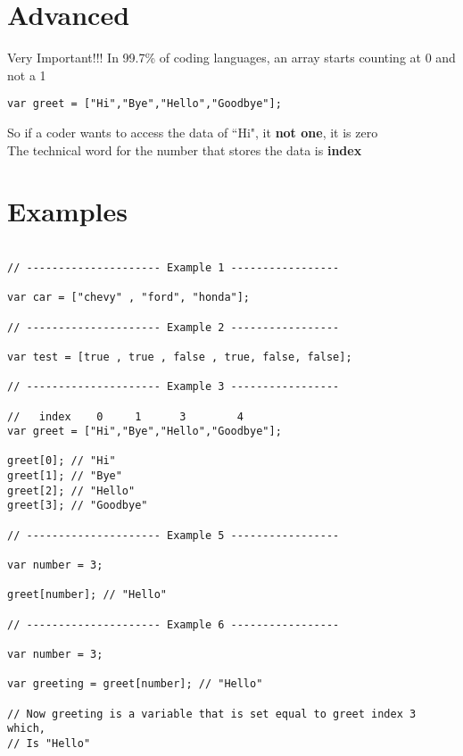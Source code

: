 \documentclass[12pt, letterpaper]{article}
\begin{document}
\section*{Advanced}

Very Important!!! In 99.7\% of coding languages, an array starts counting at 0 and not a 1
\begin{lstlisting}
var greet = ["Hi","Bye","Hello","Goodbye"];
\end{lstlisting}
So if a coder wants to access the data of ``Hi", it \textbf{not one}, it is zero\\
The technical word for the number that stores the data is \textbf{index}

\section*{Examples}

\begin{lstlisting}

// --------------------- Example 1 -----------------

var car = ["chevy" , "ford", "honda"];

// --------------------- Example 2 -----------------

var test = [true , true , false , true, false, false];

// --------------------- Example 3 -----------------

//   index    0     1      3        4
var greet = ["Hi","Bye","Hello","Goodbye"];

greet[0]; // "Hi"
greet[1]; // "Bye"
greet[2]; // "Hello"
greet[3]; // "Goodbye"

// --------------------- Example 5 -----------------

var number = 3;

greet[number]; // "Hello"

// --------------------- Example 6 -----------------

var number = 3;

var greeting = greet[number]; // "Hello"

// Now greeting is a variable that is set equal to greet index 3 which, 
// Is "Hello"


\end{lstlisting}
\end{document}
